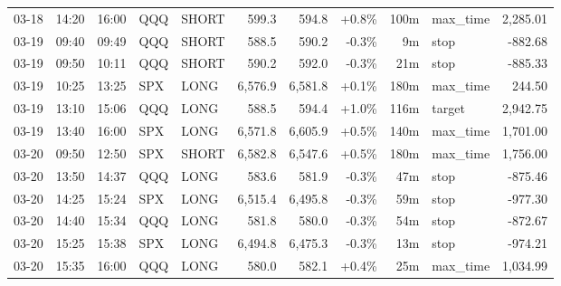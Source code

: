 \documentclass[11pt,a4paper,twoside]{article}
\begin{document}
\begin{center}
\begin{longtable}{>{\color{txtmain}}l l l l l r r r r >{\color{txtmain}}l r}
03-18 & 14:20 & 16:00 & QQQ & SHORT & 599.3 & 594.8 & \textcolor{wingreen}{+0.8\%} & 100m & max\_time & \textcolor{wingreen}{2,285.01} \\
03-19 & 09:40 & 09:49 & QQQ & SHORT & 588.5 & 590.2 & \textcolor{lossred}{-0.3\%} & 9m & stop & \textcolor{lossred}{-882.68} \\
03-19 & 09:50 & 10:11 & QQQ & SHORT & 590.2 & 592.0 & \textcolor{lossred}{-0.3\%} & 21m & stop & \textcolor{lossred}{-885.33} \\
03-19 & 10:25 & 13:25 & SPX & LONG & 6,576.9 & 6,581.8 & \textcolor{wingreen}{+0.1\%} & 180m & max\_time & \textcolor{wingreen}{244.50} \\
03-19 & 13:10 & 15:06 & QQQ & LONG & 588.5 & 594.4 & \textcolor{wingreen}{+1.0\%} & 116m & target & \textcolor{wingreen}{2,942.75} \\
03-19 & 13:40 & 16:00 & SPX & LONG & 6,571.8 & 6,605.9 & \textcolor{wingreen}{+0.5\%} & 140m & max\_time & \textcolor{wingreen}{1,701.00} \\
03-20 & 09:50 & 12:50 & SPX & SHORT & 6,582.8 & 6,547.6 & \textcolor{wingreen}{+0.5\%} & 180m & max\_time & \textcolor{wingreen}{1,756.00} \\
03-20 & 13:50 & 14:37 & QQQ & LONG & 583.6 & 581.9 & \textcolor{lossred}{-0.3\%} & 47m & stop & \textcolor{lossred}{-875.46} \\
03-20 & 14:25 & 15:24 & SPX & LONG & 6,515.4 & 6,495.8 & \textcolor{lossred}{-0.3\%} & 59m & stop & \textcolor{lossred}{-977.30} \\
03-20 & 14:40 & 15:34 & QQQ & LONG & 581.8 & 580.0 & \textcolor{lossred}{-0.3\%} & 54m & stop & \textcolor{lossred}{-872.67} \\
03-20 & 15:25 & 15:38 & SPX & LONG & 6,494.8 & 6,475.3 & \textcolor{lossred}{-0.3\%} & 13m & stop & \textcolor{lossred}{-974.21} \\
03-20 & 15:35 & 16:00 & QQQ & LONG & 580.0 & 582.1 & \textcolor{wingreen}{+0.4\%} & 25m & max\_time & \textcolor{wingreen}{1,034.99} \\
\end{longtable}
\end{center}
\clearpage
\end{document}
